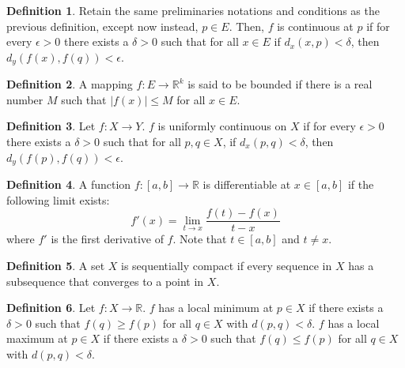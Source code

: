 \documentclass[12pt]{article}
\theoremstyle{definition}
\newtheorem{definition}{Definition}
\theoremstyle{named}
\begin{document}
\renewcommand{\thedefinition}{6.1}
\begin{definition}
    Retain the same preliminaries notations and conditions as the previous definition, except now instead, $p \in E$. Then, $f$ is continuous at $p$ if for every $\epsilon > 0$ there exists a $\delta > 0$ such that for all $x \in E$ if $d_x(x,p) < \delta$, then $d_y(f(x), f(q)) < \epsilon$. 
\end{definition}

\renewcommand{\thedefinition}{6.1}
\begin{definition}
    A mapping $f: E \to \mathbb{R}^k$ is said to be bounded if there is a real number $M$ such that $|f(x)| \leq M$ for all $x \in E$. 
\end{definition}

\renewcommand{\thedefinition}{6.1}
\begin{definition}
    Let $f: X \to Y$. $f$ is uniformly continuous on $X$ if for every $\epsilon > 0$ there exists a $\delta > 0$ such that for all $p,q \in X$, if $d_x(p,q) < \delta$, then $d_y(f(p), f(q)) < \epsilon$. 
\end{definition}

\renewcommand{\thedefinition}{6.1}
\begin{definition}
    A function $f: [a,b] \to \mathbb{R}$ is differentiable at $x \in [a,b]$ if the following limit exists: 
    $$
    f'(x) = \lim_{t \to x} \frac{f(t) - f(x)}{t-x}
    $$
    where $f'$ is the first derivative of $f$. Note that $t \in [a,b]$ and $t \neq x$. 
\end{definition}

\renewcommand{\thedefinition}{6.1}
\begin{definition}
    A set $X$ is sequentially compact if every sequence in $X$ has a subsequence that converges to a point in $X$. 
\end{definition}

\renewcommand{\thedefinition}{6.1}
\begin{definition}
    Let $f: X \to \mathbb{R}$. $f$ has a local minimum at $p \in X$ if there exists a $\delta > 0$ such that $f(q) \geq f(p)$ for all $q \in X$ with $d(p,q) < \delta$. $f$ has a local maximum at $p \in X$ if there exists a $\delta > 0$ such that $f(q) \leq f(p)$ for all $q \in X$ with $d(p,q) < \delta$. 
\end{definition}
\end{document}
